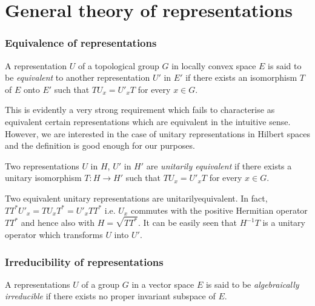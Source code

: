 
\chapter{General  theory of representations}\label{partII-chap5}
 
\setcounter{section}{5}
\setcounter{subsection}{0}
\subsection{Equivalence of
  representations}\label{partII-chap5-sec5.1}\pageoriginale%

\begin{defi*}%
A representation $U$ of  a topological group  $G$ in locally convex
space $E$ is said  to be {\em equivalent} to another representation
$U'$ in $E'$ if there  exists  an isomorphism $T$ of $E$  onto  $E'$
such  that $TU_{x} = U'_{x}T$ for every  $x \in G$. 
\end{defi*}

This  is evidently  a very strong requirement  which fails to
characterise as equivalent certain representations  which are
equivalent in the   intuitive  sense. However, we  are interested  in
the case  of unitary  representations  in Hilbert  spaces and the
definition is good enough for our purposes. 
 
\begin{defi*}%
Two representations  $U$ in $H$, $U'$ in $H'$ are {\em unitarily
  equivalent} if there exists a unitary isomorphism   $T:H
\rightarrow H'$ such that 
$TU_{x}=U'_{x}T$  for  every $x \in  G$. 
\end{defi*}

\setcounter{proposition}{0}
\begin{proposition}\label{partII-chap5-prop1}%
 Two equivalent unitary representations are unitarily\break equivalent. In
 fact, $TT^*U'_{x}= TU_{x}T^*=U'_{x}TT^*$ i.e. $U_{x}$ commutes  with the
 positive Hermitian operator  $TT^*$ and hence also with
 $H=\sqrt{TT^*}$. It  can be easily seen that  $H^{-1}T$ is  a unitary
 operator which  transforms  $U$ into $U'$. 
\end{proposition} 

\subsection{Irreducibility  of  representations}\label{partII-chap5-sec5.2}%

\begin{defn}\label{partII-chap5-defi1} 
A representations  $U$ of  a  group
  $G$ in a vector  space  $E$  is  said to be  {\em algebraically
    irreducible}  if  there  exists  no proper  invariant  subspace
  of $E$. 
\end{defn}
 
